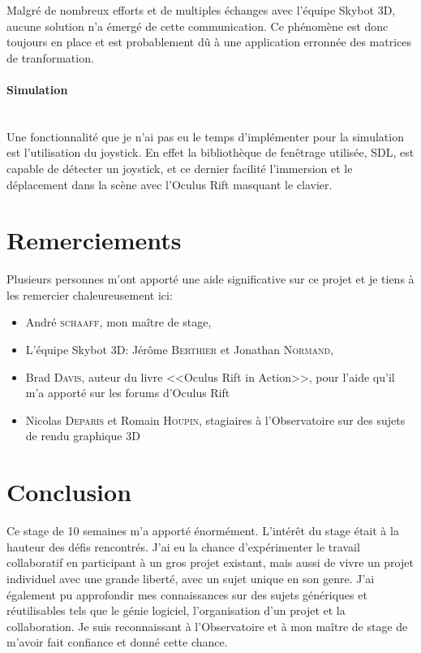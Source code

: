 \documentclass[a4paper,french,12pt]{article}
\begin{document}
	Malgré de nombreux efforts et de multiples échanges avec l'équipe Skybot 3D, aucune solution n'a émergé de 
	cette communication. Ce phénomène est donc toujours en place et est probablement dû à une application erronnée
	des matrices de tranformation.
	
      \paragraph{Simulation}~\\
	Une fonctionnalité que je n'ai pas eu le temps d'implémenter pour la simulation est l'utilisation du joystick.
	En effet la bibliothèque de fenêtrage utilisée, SDL, est capable de détecter un joystick, et ce dernier 
	facilité l'immersion et le déplacement dans la scène avec l'Oculus Rift masquant le clavier.
	
	
		
\section{Remerciements}

	Plusieurs personnes m’ont apporté une aide significative sur ce projet et je tiens à les remercier chaleureusement ici: 

	\begin{itemize}
	\item André \textsc{schaaff}, mon maître de stage,
	\item L'équipe Skybot 3D: Jérôme \textsc{Berthier} et Jonathan \textsc{Normand},
	\item Brad \textsc{Davis}, auteur du livre <<Oculus Rift in Action>>, pour l'aide qu'il m'a apporté sur les forums d'Oculus Rift
	\item Nicolas \textsc{Deparis} et Romain \textsc{Houpin}, stagiaires à l'Observatoire sur des sujets de rendu graphique 3D
	\end{itemize}

\section{Conclusion}


	Ce stage de 10 semaines m'a apporté énormément. L'intérêt du stage était à la hauteur des défis rencontrés.
	J'ai eu la chance d'expérimenter le travail collaboratif en participant à un gros projet existant, mais aussi 
	de vivre un projet individuel avec une grande liberté, avec un sujet unique en son genre.
	J'ai également pu approfondir mes connaissances sur des sujets génériques et réutilisables tels que le génie logiciel,
	l'organisation d'un projet et la collaboration.
	Je suis reconnaissant à l'Observatoire et à mon maître de stage de m'avoir fait confiance et donné cette chance.
	
\end{document}
